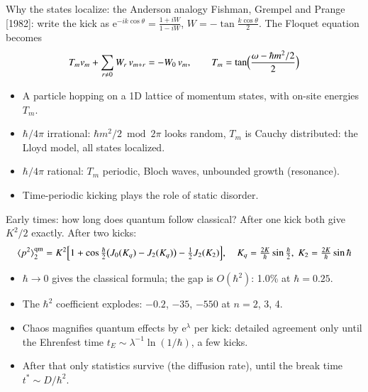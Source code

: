 \documentclass[aspectratio=169,10pt]{beamer}
\newcommand{\avg}[1]{\langle #1 \rangle}
\newcommand{\ee}{\mathrm{e}}
\newcommand{\src}[1]{{\small\color{gray}[#1]}}
\begin{document}
\begin{frame}{Why the states localize: the Anderson analogy}
  Fishman, Grempel and Prange \src{1982}: write the kick as $\ee^{-ik\cos\theta} = \frac{1 + iW}{1 - iW}$,
  $W = -\tan\frac{k\cos\theta}{2}$. The Floquet equation becomes
  \[
    T_m v_m + \sum_{r\neq0} W_r\,v_{m+r} = -W_0\,v_m,
    \qquad T_m = \tan\Bigl(\frac{\omega - \hbar m^2/2}{2}\Bigr)
  \]
  \begin{itemize}
    \item A particle hopping on a 1D lattice of momentum states, with on-site energies $T_m$.
    \item $\hbar/4\pi$ irrational: $\hbar m^2/2 \bmod 2\pi$ looks random, $T_m$ is Cauchy distributed:
    the \alert{Lloyd model}, all states localized.
    \item $\hbar/4\pi$ rational: $T_m$ periodic, Bloch waves, unbounded growth (resonance).
    \item Time-periodic kicking plays the role of static disorder.
  \end{itemize}
\end{frame}

\begin{frame}{Early times: how long does quantum follow classical?}
  After one kick both give $K^2/2$ exactly. After two kicks:
  \[
    \avg{p^2}_2^{\rm qm} = K^2\Bigl[1 + \cos\tfrac{\hbar}{2}\bigl(J_0(K_q) - J_2(K_q)\bigr) - \tfrac12 J_2(K_2)\Bigr],
    \quad K_q = \tfrac{2K}{\hbar}\sin\tfrac{\hbar}{2},\ K_2 = \tfrac{2K}{\hbar}\sin\hbar
  \]
  \begin{itemize}
    \item $\hbar\to0$ gives the classical formula; the gap is $O(\hbar^2)$: 1.0\% at $\hbar = 0.25$.
    \item The $\hbar^2$ coefficient explodes: $-0.2$, $-35$, $-550$ at $n = 2$, 3, 4.
    \item Chaos magnifies quantum effects by $\ee^{\lambda}$ per kick: detailed agreement only until the
    \alert{Ehrenfest time} $t_E \sim \lambda^{-1}\ln(1/\hbar)$, a few kicks.
    \item After that only statistics survive (the diffusion rate), until the break time $t^* \sim D/\hbar^2$.
  \end{itemize}
\end{frame}
\end{document}
